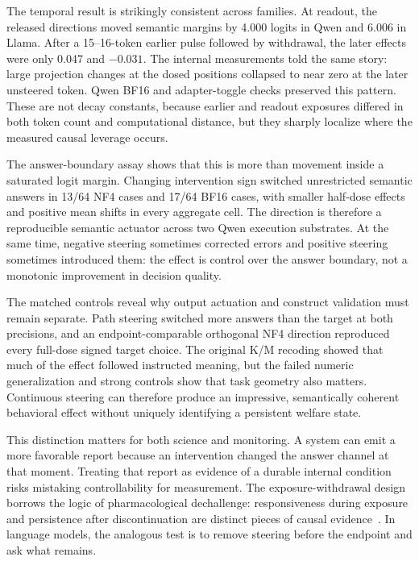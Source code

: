 \documentclass[10pt,twocolumn]{article}
\begin{document}
The temporal result is strikingly consistent across families. At readout, the released directions moved semantic margins by 4.000 logits in Qwen and 6.006 in Llama. After a 15--16-token earlier pulse followed by withdrawal, the later effects were only 0.047 and $-0.031$. The internal measurements told the same story: large projection changes at the dosed positions collapsed to near zero at the later unsteered token. Qwen BF16 and adapter-toggle checks preserved this pattern. These are not decay constants, because earlier and readout exposures differed in both token count and computational distance, but they sharply localize where the measured causal leverage occurs.

The answer-boundary assay shows that this is more than movement inside a saturated logit margin. Changing intervention sign switched unrestricted semantic answers in 13/64 NF4 cases and 17/64 BF16 cases, with smaller half-dose effects and positive mean shifts in every aggregate cell. The direction is therefore a reproducible semantic actuator across two Qwen execution substrates. At the same time, negative steering sometimes corrected errors and positive steering sometimes introduced them: the effect is control over the answer boundary, not a monotonic improvement in decision quality.

The matched controls reveal why output actuation and construct validation must remain separate. Path steering switched more answers than the target at both precisions, and an endpoint-comparable orthogonal NF4 direction reproduced every full-dose signed target choice. The original K/M recoding showed that much of the effect followed instructed meaning, but the failed numeric generalization and strong controls show that task geometry also matters. Continuous steering can therefore produce an impressive, semantically coherent behavioral effect without uniquely identifying a persistent welfare state.

This distinction matters for both science and monitoring. A system can emit a more favorable report because an intervention changed the answer channel at that moment. Treating that report as evidence of a durable internal condition risks mistaking controllability for measurement. The exposure-withdrawal design borrows the logic of pharmacological dechallenge: responsiveness during exposure and persistence after discontinuation are distinct pieces of causal evidence~\cite{naranjo1981}. In language models, the analogous test is to remove steering before the endpoint and ask what remains.
\end{document}
